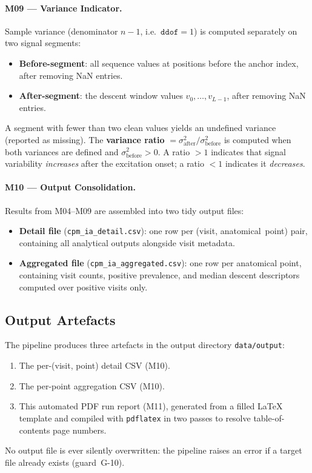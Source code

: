 \documentclass[a4paper,11pt]{article}
\begin{document}
\paragraph{M09 --- Variance Indicator.}
Sample variance (denominator $n - 1$, i.e.\ $\mathtt{ddof} = 1$) is computed separately
on two signal segments:
\begin{itemize}
  \item \textbf{Before-segment}: all sequence values at positions before the anchor index,
        after removing NaN entries.
  \item \textbf{After-segment}: the descent window values $v_0, \ldots, v_{L-1}$, after
        removing NaN entries.
\end{itemize}
A segment with fewer than two clean values yields an undefined variance (reported as
missing). The \textbf{variance ratio}
$= \sigma^2_{\mathrm{after}} / \sigma^2_{\mathrm{before}}$
is computed when both variances are defined and $\sigma^2_{\mathrm{before}} > 0$.
A ratio $> 1$ indicates that signal variability \emph{increases} after the excitation
onset; a ratio $< 1$ indicates it \emph{decreases}.

\paragraph{M10 --- Output Consolidation.}
Results from M04--M09 are assembled into two tidy output files:
\begin{itemize}
  \item \textbf{Detail file} (\texttt{cpm\_ia\_detail.csv}): one row per
        (visit, anatomical~point) pair, containing all analytical outputs alongside visit
        metadata.
  \item \textbf{Aggregated file} (\texttt{cpm\_ia\_aggregated.csv}): one row per
        anatomical point, containing visit counts, positive prevalence, and median descent
        descriptors computed over positive visits only.
\end{itemize}

\subsection{Output Artefacts}

The pipeline produces three artefacts in the output directory \texttt{data/output}:
\begin{enumerate}
  \item The per-(visit, point) detail CSV (M10).
  \item The per-point aggregation CSV (M10).
  \item This automated PDF run report (M11), generated from a filled \LaTeX{} template
        and compiled with \texttt{pdflatex} in two passes to resolve table-of-contents
        page numbers.
\end{enumerate}
No output file is ever silently overwritten: the pipeline raises an error if a target
file already exists (guard~G-10).
\end{document}
